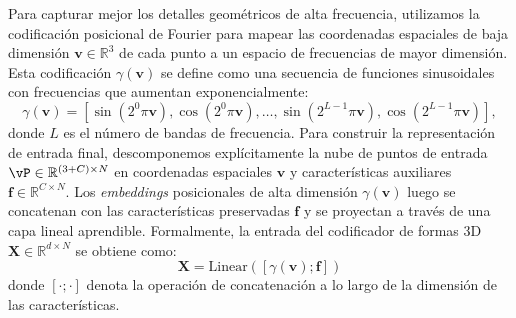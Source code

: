 \documentclass[../../book-main_es.tex]{subfiles}
\begin{document}
Para capturar mejor los detalles geométricos de alta frecuencia,
utilizamos la codificación posicional de Fourier para mapear las
coordenadas espaciales de baja dimensión
$\boldsymbol{v} \in \mathbb{R}^3$
de cada punto a un espacio de frecuencias de mayor dimensión.
Esta codificación $\gamma(\boldsymbol{v})$ se define como una
secuencia de funciones sinusoidales con frecuencias que
aumentan exponencialmente:
$$\gamma(\boldsymbol{v}) = [\sin(2^0\pi \boldsymbol{v}), \cos(2^0\pi \boldsymbol{v}), \dots, \sin(2^{L-1}\pi \boldsymbol{v}), \cos(2^{L-1}\pi \boldsymbol{v})],$$
donde $L$ es el número de bandas de frecuencia.
Para construir la representación de entrada final, descomponemos explícitamente
la nube de puntos de entrada $\vP \in \mathbb{R}^{(3+C)
\times N}$ en coordenadas espaciales $\boldsymbol{v}$ y
características auxiliares $\boldsymbol{f} \in \mathbb{R}^{C \times
N}$. Los \textit{embeddings} posicionales de alta dimensión
$\gamma(\boldsymbol{v})$ luego se concatenan con las
características preservadas $\boldsymbol{f}$ y se proyectan a través de una
capa lineal aprendible. Formalmente, la entrada del codificador de formas 3D
$\boldsymbol{X} \in \mathbb{R}^{d \times N}$ se obtiene como:
$$\boldsymbol{X} = \text{Linear}([\gamma(\boldsymbol{v}); \boldsymbol{f}])$$
donde $[\cdot ; \cdot]$ denota la operación de concatenación a lo largo de la 
dimensión de las características.

\end{document}
